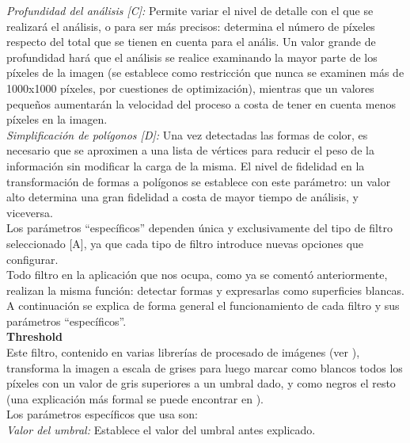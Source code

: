 		\noindent\textit{Profundidad del análisis [C]:} Permite variar el nivel de detalle con el que se realizará el análisis, o para ser más precisos: determina el número de píxeles respecto del total que se tienen en cuenta para el anális. Un valor grande de profundidad hará que el análisis se realice examinando la mayor parte de los píxeles de la imagen (se establece como restricción que nunca se examinen más de 1000x1000 píxeles, por cuestiones de optimización), mientras que un valores pequeños aumentarán la velocidad del proceso a costa de tener en cuenta menos píxeles en la imagen.\\
		
		\noindent\textit{Simplificación de polígonos [D]:} Una vez detectadas las formas de color, es necesario que se aproximen a una lista de vértices para reducir el peso de la información sin modificar la carga de la misma. El nivel de fidelidad en la transformación de formas a polígonos se establece con este parámetro: un valor alto determina una gran fidelidad a costa de mayor tiempo de análisis, y viceversa.\\

		
		\vspace{0.2in}Los parámetros ``específicos'' dependen única y exclusivamente del tipo de filtro seleccionado [A], ya que cada tipo de filtro introduce nuevas opciones que configurar. \\
		
		Todo filtro en la aplicación que nos ocupa, como ya se comentó anteriormente, realizan la misma función: detectar formas y expresarlas como superficies blancas. A continuación se explica de forma general el funcionamiento de cada filtro y sus parámetros ``específicos''.\\
		
	\noindent\textbf{Threshold}\\
		
		Este filtro, contenido en varias librerías de procesado de imágenes (ver \cite{opencvDoc}), transforma la imagen a escala de grises para luego marcar como blancos todos los píxeles con un valor de gris superiores a un umbral dado, y como negros el resto (una explicación más formal se puede encontrar en \cite{pajares}).\\
		
		Los parámetros específicos que usa son:\\		
		
		\noindent\textit{Valor del umbral:} Establece el valor del umbral antes explicado.\\
		
